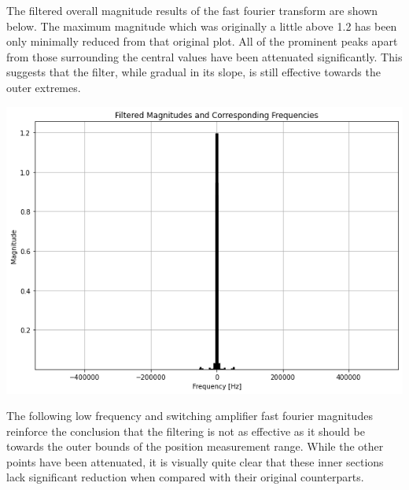 \documentclass[12pt]{report}
\begin{document}
The filtered overall magnitude results of the fast fourier transform are shown below. The maximum magnitude which was originally a little above 1.2 has been only minimally reduced from that original plot. All of the prominent peaks apart from those surrounding the central values have been attenuated significantly. This suggests that the filter, while gradual in its slope, is still effective towards the outer extremes. \\

\begin{center}
	\includegraphics[scale = 0.5]{Lab 12 - Plots/Filtered FFT1.png}\\[1.0 cm]
\end{center}

The following low frequency and switching amplifier fast fourier magnitudes reinforce the conclusion that the filtering is not as effective as it should be towards the outer bounds of the position measurement range. While the other points have been attenuated, it is visually quite clear that these inner sections lack significant reduction when compared with their original counterparts. \\ 
\end{document}
